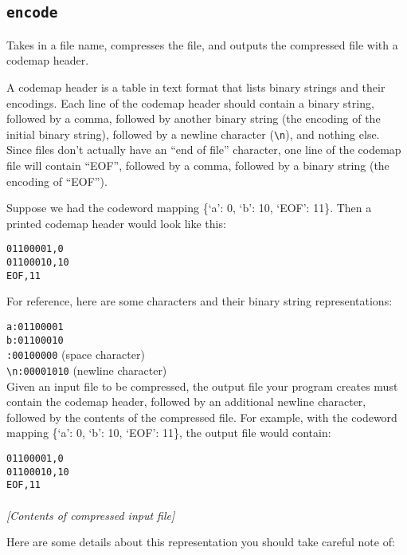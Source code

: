 \documentclass[11pt]{article}
\begin{document}
\subsection*{\texttt{encode}}

Takes in a file name, compresses the file, and outputs the compressed file with a codemap header.

A codemap header is a table in text format that lists binary strings and their encodings. Each line of the codemap header should contain a binary string, followed by a comma, followed by another binary string (the encoding of the initial binary string), followed by a newline character (\texttt{\textbackslash n}), and nothing else. Since files don't actually have an ``end of file'' character, one line of the codemap file will contain ``EOF'', followed by a comma, followed by a binary string (the encoding of ``EOF'').

Suppose we had the codeword mapping \{`a': 0, `b': 10, `EOF': 11\}. Then a printed codemap header would look like this:
\begin{center}
\begin{verbatim}
01100001,0
01100010,10
EOF,11
\end{verbatim}
\end{center}

For reference, here are some characters and their binary string representations:

\texttt{a:01100001}\\
\texttt{b:01100010}\\
\texttt{\textvisiblespace:00100000} (space character)\\
\texttt{\textbackslash n:00001010} (newline character)\\

Given an input file to be compressed, the output file your program creates must contain the codemap header, followed by an additional newline character, followed by the contents of the compressed file. For example, with the codeword mapping \{`a': 0, `b': 10, `EOF': 11\}, the output file would contain:
\begin{framed}
\texttt{01100001,0 \\
01100010,10 \\
EOF,11 \\ \\}
\emph{[Contents of compressed input file]}
\end{framed}

Here are some details about this representation you should take careful note of:
\end{document}

